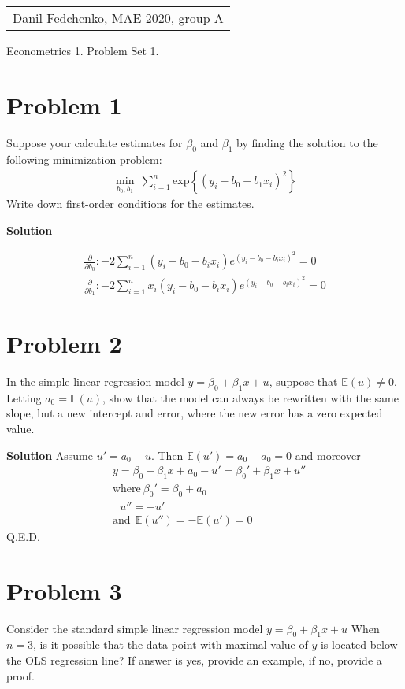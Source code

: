 \documentclass[a4paper]{article}
\newcommand{\expect}{\mathbb{E}}
\begin{document}
	\begin{flushright}
	\begin{tabular}{r}
		Danil Fedchenko, MAE 2020, group A \\
	\end{tabular}
\end{flushright}


\begin{center}
	Econometrics 1. Problem Set 1.
\end{center}
\section*{Problem 1}
 Suppose your calculate estimates for $\beta_0$ and $\beta_1$ by finding the solution to the following minimization problem:
 \begin{align*}
 \underset{b_0, b_1}{\min}\ \sum_{i=1}^n \text{exp} \left\{(y_i - b_0 - b_1x_i)^2\right\}
 \end{align*}
 Write down first-order conditions for the estimates.
 
 
 \textbf{Solution}
 
 
 \begin{align*}
 \frac{\partial}{\partial b_0}: -2 \sum_{i=1}^n (y_i - b_0 - b_ix_i)e^{(y_i - b_0 - b_ix_i)^2} = 0\\
 \frac{\partial}{\partial b_1}: -2 \sum_{i=1}^n x_i(y_i - b_0 - b_ix_i)e^{(y_i - b_0 - b_ix_i)^2} = 0
 \end{align*}
 \section*{Problem 2}
 In the simple linear regression model $y = \beta_0 + \beta_1x + u$, suppose that $\expect (u) \neq 0$. Letting $a_0 = \expect(u)$, show that the model can always be rewritten with the same slope, but a new
 intercept and error, where the new error has a zero expected value.
 
 
 
 \textbf{Solution}
 Assume $u' = a_0 - u$. Then $\expect(u') = a_0 - a_0 = 0$ and moreover
 \begin{align*}
 &y = \beta_0 + \beta_1 x + a_0 - u' = \beta_0' + \beta_1 x + u''\\
 &\text{where}\ \beta_0' = \beta_0 + a_0\\
 &\ \ \ u'' = -u'\\
 &\text{and}\ \ \expect(u'') = -\expect(u') = 0
 \end{align*}
 Q.E.D.
 \section*{Problem 3}
 Consider the standard simple linear regression model $y = \beta_0 + \beta_1 x + u$
 When $n = 3$, is it possible that the data point with maximal value of $y$ is located below the
 OLS regression line? If answer is yes, provide an example, if no, provide a proof.
 
\end{document}
